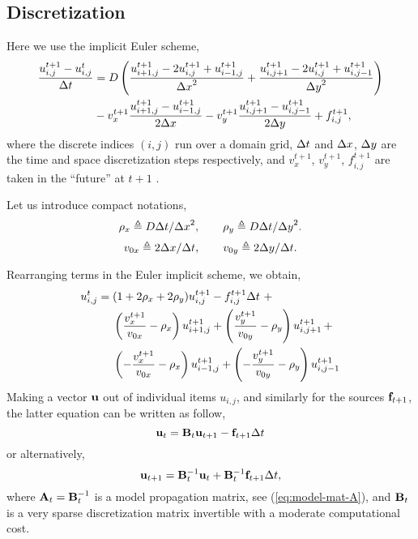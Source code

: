 \documentclass[]{article}
\begin{document}
\subsection{Discretization}
Here we use the implicit Euler scheme,
\begin{equation}
\begin{aligned}
\frac{\myu{i}{j}{t+1} - \myu{i}{j}{t}}{\Delta t} = {} &
D \left(
\frac{\myu{i+1}{j}{t+1} - 2\myu{i}{j}{t+1} + \myu{i-1}{j}{t+1}}{\mydx^2} +
\frac{\myu{i}{j+1}{t+1} - 2\myu{i}{j}{t+1} + \myu{i}{j-1}{t+1}}{\mydy^2}
\right) \\
& {\!\!\!\!\!\!\!\!}
-v_x^{t+1} \frac{\myu{i+1}{j}{t+1} - \myu{i-1}{j}{t+1}}{2\mydx} 
-v_y^{t+1} \frac{\myu{i}{j+1}{t+1} - \myu{i}{j-1}{t+1}}{2\mydy}
+ f_{i,j}^{t+1},
\end{aligned}
\end{equation}
where the discrete indices $(i,j)$ run over a domain grid, ${\Delta{t}}$ and ${\Delta{x}}$, ${\Delta{y}}$ are the time and space discretization steps respectively, and $v_x^{t+1}$, $v_y^{t+1}$, $f_{i,j}^{t+1}$ are taken in the ``future'' at $t+1$ .

Let us introduce compact notations,
\begin{equation}
\rho_x \triangleq D {\Delta{t}} / {\Delta{x}}^2, \qquad \rho_y \triangleq D {\Delta{t}} / {\Delta{y}}^2.
\end{equation}
\begin{equation}
v_{0x} \triangleq 2{\Delta{x}} / {\Delta{t}}, \qquad v_{0y} \triangleq 2{\Delta{y}} / {\Delta{t}}.
\end{equation}

Rearranging terms in the Euler implicit scheme, we obtain,
\begin{equation}
\begin{aligned}
u_{{i},{j}}^{t} = {} & (1 + 2 \rho_x + 2 \rho_y) u_{{i},{j}}^{t+1} - 
f_{i,j}^{t+1} {\Delta{t}} \,\,+ \\
& \left(\frac{v_x^{t+1}}{v_{0x}} - \rho_x\right) u_{{i+1},{j}}^{t+1} +
  \left(\frac{v_y^{t+1}}{v_{0y}} - \rho_y\right) u_{{i},{j+1}}^{t+1} \,+ \\
& \left(-\frac{v_x^{t+1}}{v_{0x}} - \rho_x\right) u_{{i-1},{j}}^{t+1} +
  \left(-\frac{v_y^{t+1}}{v_{0y}} - \rho_y\right) u_{{i},{j-1}}^{t+1}
\end{aligned}
\label{eq:discretization}
\end{equation}
Making a vector ${\bf u}$ out of individual items $u_{i,j}$, and similarly for the sources ${\bf f}_{t+1}$, the latter equation can be written as follow,
\begin{equation}
{\bf u}_{t} = {\bf B}_t {\bf u}_{t+1} - {\bf f}_{t+1}{\Delta{t}}
\end{equation}
or alternatively,
\begin{equation}
{\bf u}_{t+1} = {\bf B}_t^{-1} {\bf u}_t + {\bf B}_t^{-1} {\bf f}_{t+1}{\Delta{t}},
\end{equation}
where ${\bf A}_t = {\bf B}^{-1}_t$ is a model propagation matrix, see (\ref{eq:model-mat-A}), and ${\bf B}_t$ is a very sparse discretization matrix invertible with a moderate computational cost.
\end{document}
